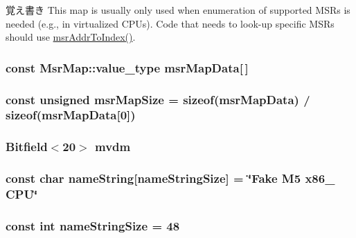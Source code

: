\begin{DoxyNote}{覚え書き}
This map is usually only used when enumeration of supported MSRs is needed (e.g., in virtualized CPUs). Code that needs to look-\/up specific MSRs should use \hyperlink{namespaceX86ISA_a700421607b87243921222a0b4183eef3}{msrAddrToIndex()}. 
\end{DoxyNote}
\hypertarget{namespaceX86ISA_a40c8f3c4b56cb7d97cb030da5c0307d9}{
\subsubsection[{msrMapData}]{\setlength{\rightskip}{0pt plus 5cm}const MsrMap::value\_\-type {\bf msrMapData}\mbox{[}$\,$\mbox{]}}}
\label{namespaceX86ISA_a40c8f3c4b56cb7d97cb030da5c0307d9}
\hypertarget{namespaceX86ISA_adbf76fcc2f77bd504c0081638819d429}{
\subsubsection[{msrMapSize}]{\setlength{\rightskip}{0pt plus 5cm}const unsigned {\bf msrMapSize} = sizeof({\bf msrMapData}) / sizeof({\bf msrMapData}\mbox{[}0\mbox{]})}}
\label{namespaceX86ISA_adbf76fcc2f77bd504c0081638819d429}
\hypertarget{namespaceX86ISA_acb403d111ee550abef9b833656714ac6}{
\subsubsection[{mvdm}]{\setlength{\rightskip}{0pt plus 5cm}Bitfield$<$20$>$ {\bf mvdm}}}
\label{namespaceX86ISA_acb403d111ee550abef9b833656714ac6}
\hypertarget{namespaceX86ISA_a68b60896353bac8d836726b5902dfbe6}{
\subsubsection[{nameString}]{\setlength{\rightskip}{0pt plus 5cm}const char {\bf nameString}\mbox{[}{\bf nameStringSize}\mbox{]} = \char`\"{}Fake M5 x86\_ CPU\char`\"{}}}
\label{namespaceX86ISA_a68b60896353bac8d836726b5902dfbe6}
\hypertarget{namespaceX86ISA_a8e62af5576a372dc91c099b42e1541f4}{
\subsubsection[{nameStringSize}]{\setlength{\rightskip}{0pt plus 5cm}const int {\bf nameStringSize} = 48}}

